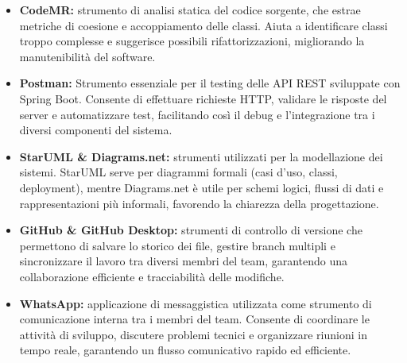 \begin{itemize}
\item \textbf{CodeMR:} strumento di analisi statica del codice sorgente, che estrae metriche di
coesione e accoppiamento delle classi. Aiuta a identificare classi troppo complesse
e suggerisce possibili rifattorizzazioni, migliorando la manutenibilità del software.

\item \textbf{Postman:} Strumento essenziale per il testing delle API REST sviluppate con Spring
Boot. Consente di effettuare richieste HTTP, validare le risposte del server e automatizzare
test, facilitando così il debug e l’integrazione tra i diversi componenti
del sistema.

\item \textbf{StarUML \& Diagrams.net:} strumenti utilizzati per la modellazione dei sistemi.
StarUML serve per diagrammi formali (casi d’uso, classi, deployment), mentre
Diagrams.net è utile per schemi logici, flussi di dati e rappresentazioni più informali,
favorendo la chiarezza della progettazione.

\item \textbf{GitHub \& GitHub Desktop:} strumenti di controllo di versione che permettono
di salvare lo storico dei file, gestire branch multipli e sincronizzare il lavoro tra
diversi membri del team, garantendo una collaborazione efficiente e tracciabilità
delle modifiche.

\item \textbf{WhatsApp:} applicazione di messaggistica utilizzata come strumento di comunicazione
interna tra i membri del team. Consente di coordinare le attività di sviluppo,
discutere problemi tecnici e organizzare riunioni in tempo reale, garantendo un
flusso comunicativo rapido ed efficiente.

\end{itemize}
